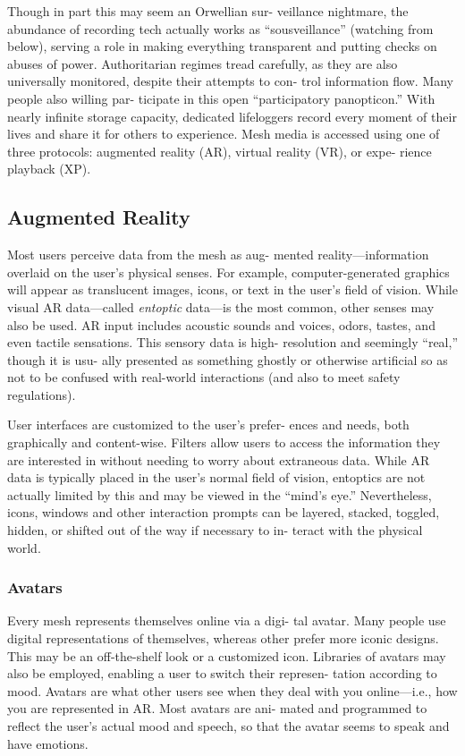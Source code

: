 Though in part this may seem an Orwellian sur-
veillance nightmare, the abundance of recording 
tech actually works as ``sousveillance'' (watching 
from below), serving a role in making everything 
transparent and putting checks on abuses of power. 
Authoritarian regimes tread carefully, as they are also 
universally monitored, despite their attempts to con-
trol information flow. Many people also willing par-
ticipate in this open ``participatory panopticon.'' With 
nearly infinite storage capacity, dedicated lifeloggers 
record every moment of their lives and share it for 
others to experience.
Mesh media is accessed using one of three protocols: 
augmented reality (AR), virtual reality (VR), or expe-
rience playback (XP).

\subsection{Augmented Reality}

Most users perceive data from the mesh as aug-
mented reality—information overlaid on the user's 
physical senses. For example, computer-generated 
graphics will appear as translucent images, icons, 
or text in the user's field of vision. While visual AR 
data—called  \textit{entoptic} data—is the most common, 
other senses may also be used. AR input includes 
acoustic sounds and voices, odors, tastes, and 
even tactile sensations. This sensory data is high-
resolution and seemingly ``real,'' though it is usu-
ally presented as something ghostly or otherwise 
artificial so as not to be confused with real-world 
interactions (and also to meet safety regulations).

User interfaces are customized to the user's prefer-
ences and needs, both graphically and content-wise. 
Filters allow users to access the information they 
are interested in without needing to worry about 
extraneous data. While AR data is typically placed 
in the user's normal field of vision, entoptics are not 
actually limited by this and may be viewed in the 
``mind's eye.'' Nevertheless, icons, windows and other 
interaction prompts can be layered, stacked, toggled, 
hidden, or shifted out of the way if necessary to in-
teract with the physical world.

\subsubsection{Avatars}

Every mesh represents themselves online via a digi-
tal avatar. Many people use digital representations 
of themselves, whereas other prefer more iconic 
designs. This may be an off-the-shelf look or a 
customized icon. Libraries of avatars may also be 
employed, enabling a user to switch their represen-
tation according to mood. Avatars are what other 
users see when they deal with you online—i.e., how 
you are represented in AR. Most avatars are ani-
mated and programmed to reflect the user's actual 
mood and speech, so that the avatar seems to speak 
and have emotions.

